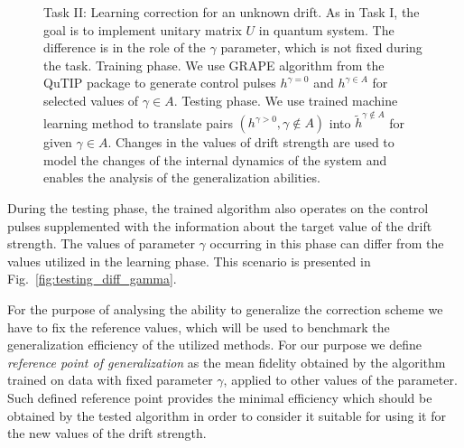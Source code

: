 \documentclass[aps,pra,showkeys,showpacs,notitlepage,superscriptaddress]{revtex4-1}
\newcommand{\1}{{\rm 1\hspace{-0.9mm}l}}
\newcommand{\qutip}{QuTIP\xspace}
\newcommand{\NCP}{\ensuremath{h^{\gamma=0}}\xspace}
\newcommand{\DCP}{\ensuremath{h^{\gamma >0}}\xspace}
\newcommand{\DCPinA}{\ensuremath{h^{\gamma \in A}}\xspace}
\newcommand{\nnDCPniA}{\ensuremath{\tilde{h}^{\gamma \not\in A}}\xspace}
\begin{document}
\begin{figure}[ht!]
{

    \label{fig:testing_diff_gamma}}
  \centering

  
  \caption{Task II: Learning correction for an unknown drift. 
      As in Task I, the goal is to implement unitary matrix $U$ in quantum system. The difference is in the role of the $\gamma$ parameter, which is not fixed during the task.  Training phase. We use GRAPE algorithm from the \qutip package to generate control pulses \NCP and \DCPinA for selected values of $\gamma \in A$.  Testing phase. We use trained machine learning method to translate pairs $(\DCP, \gamma\not \in A)$ into \nnDCPniA for given $\gamma\in A$. Changes in the values of drift strength are used to model the changes of the internal dynamics of the system and enables the analysis of the generalization abilities.}\label{fig:task-ii-overview}
\end{figure}


During the testing phase, the trained algorithm also operates on the control pulses supplemented with the information about the target value of the drift strength. The values of parameter $\gamma$ occurring in this phase can differ from the values utilized in the learning phase. This scenario is presented in Fig.~\ref{fig:testing_diff_gamma}.


For the purpose of analysing the ability to generalize the correction scheme we have to fix the reference values, which will be used to benchmark the generalization efficiency of the utilized methods. For our purpose we define \emph{reference point of generalization} as the mean fidelity obtained by the algorithm trained on data with fixed parameter $\gamma$, applied to other values of the parameter. Such defined reference point provides the minimal efficiency which should be obtained by the tested algorithm in order to consider it suitable for using it for the new values of the drift strength.
\end{document}
